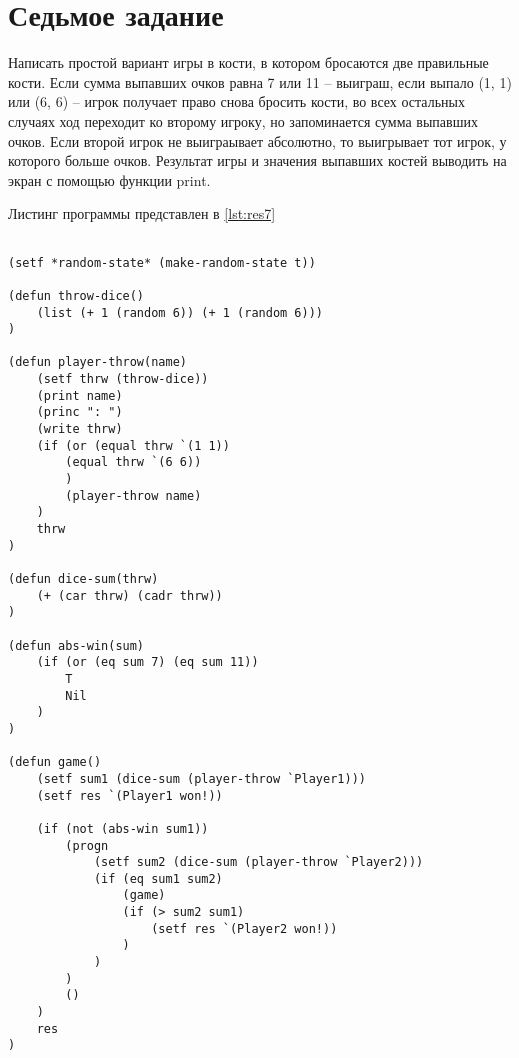 \section{ Седьмое задание}
Написать простой вариант игры в кости, в котором бросаются две правильные кости. Если сумма выпавших очков равна 7 или 11 -- выиграш, если выпало (1, 1) или (6, 6) -- игрок получает право снова бросить кости, во всех остальных случаях ход переходит ко второму игроку, но запоминается сумма выпавших очков. Если второй игрок не выиграывает абсолютно, то выигрывает тот игрок, у которого больше очков. Результат игры и значения выпавших костей выводить на экран с помощью функции print.

Листинг программы представлен в \ref{lst:res7}

\begin{lstlisting}[style=lispStyle, caption={ Программа симмуляции игры в кости.},
                    label={lst:res7}]

(setf *random-state* (make-random-state t))

(defun throw-dice()
    (list (+ 1 (random 6)) (+ 1 (random 6)))
)

(defun player-throw(name)
    (setf thrw (throw-dice))
    (print name)
    (princ ": ")
    (write thrw)
    (if (or (equal thrw `(1 1))
        (equal thrw `(6 6))
        )
        (player-throw name)
    )
    thrw
)

(defun dice-sum(thrw)
    (+ (car thrw) (cadr thrw))
)

(defun abs-win(sum)
    (if (or (eq sum 7) (eq sum 11))
        T
        Nil
    )
)

(defun game()
    (setf sum1 (dice-sum (player-throw `Player1)))
    (setf res `(Player1 won!))
    
    (if (not (abs-win sum1))
        (progn   
            (setf sum2 (dice-sum (player-throw `Player2)))
            (if (eq sum1 sum2)
                (game)
                (if (> sum2 sum1)
                    (setf res `(Player2 won!))
                )
            )
        )
        ()
    )
    res
)
\end{lstlisting}

